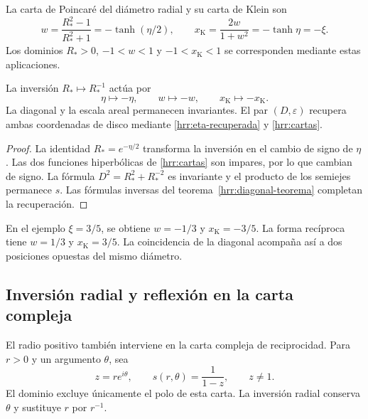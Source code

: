 La carta de Poincaré del diámetro radial y su carta de Klein son
\begin{equation}
 w=\frac{R_*^2-1}{R_*^2+1}
   =-\tanh(\eta/2),\qquad
 x_{\mathrm K}=\frac{2w}{1+w^2}=-\tanh\eta=-\xi.
 \label{hrr:cartas}
\end{equation}
Los dominios \(R_*>0\), \(-1<w<1\) y \(-1<x_{\mathrm K}<1\)
se corresponden mediante estas aplicaciones.

\begin{proposition}
\label{hrr:reciprocidad-cartas}
La inversión \(R_*\mapsto R_*^{-1}\) actúa por
\[
 \eta\mapsto-\eta,\qquad w\mapsto-w,
 \qquad x_{\mathrm K}\mapsto-x_{\mathrm K}.
\]
La diagonal y la escala areal permanecen invariantes. El par
\((D,\varepsilon)\) recupera ambas coordenadas de disco mediante
\eqref{hrr:eta-recuperada} y \eqref{hrr:cartas}.
\end{proposition}
\begin{proof}
La identidad \(R_*=e^{-\eta/2}\) transforma la inversión en el
cambio de signo de \(\eta\). Las dos funciones hiperbólicas de
\eqref{hrr:cartas} son impares, por lo que cambian de signo.
La fórmula \(D^2=R_*^2+R_*^{-2}\) es invariante y el producto
de los semiejes permanece \(s\). Las fórmulas inversas del
teorema~\ref{hrr:diagonal-teorema} completan la recuperación.
\end{proof}

En el ejemplo \(\xi=3/5\), se obtiene
\(w=-1/3\) y \(x_{\mathrm K}=-3/5\). La forma recíproca
tiene \(w=1/3\) y \(x_{\mathrm K}=3/5\). La coincidencia de
la diagonal acompaña así a dos posiciones opuestas del mismo diámetro.

\subsection{Inversión radial y reflexión en la carta compleja}

El radio positivo también interviene en la carta compleja de
reciprocidad. Para \(r>0\) y un argumento \(\theta\), sea
\[
 z=re^{i\theta},\qquad s(r,\theta)=\frac1{1-z},
 \qquad z\neq1.
\]
El dominio excluye únicamente el polo de esta carta. La inversión
radial conserva \(\theta\) y sustituye \(r\) por \(r^{-1}\).

